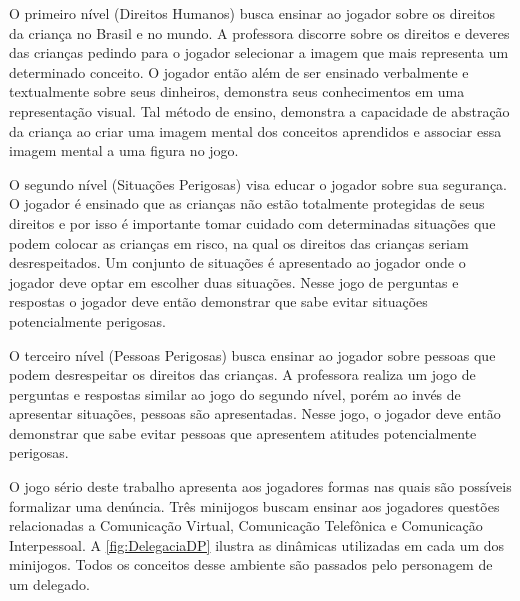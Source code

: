 O primeiro nível (Direitos Humanos) busca ensinar ao jogador sobre os direitos da criança no Brasil e no mundo. A professora discorre sobre os direitos e deveres das crianças pedindo para o jogador selecionar a imagem que mais representa um determinado conceito. O jogador então além de ser ensinado verbalmente e textualmente sobre seus dinheiros, demonstra seus conhecimentos em uma representação visual. Tal método de ensino, demonstra a capacidade de abstração da criança ao criar uma imagem mental dos conceitos aprendidos e associar essa imagem mental a uma figura no jogo. 

O segundo nível (Situações Perigosas) visa educar o jogador sobre sua segurança. O jogador é ensinado que as crianças não estão totalmente protegidas de seus direitos e por isso é importante tomar cuidado com determinadas situações que podem colocar as crianças em risco, na qual os direitos das crianças seriam desrespeitados. Um conjunto de situações é apresentado ao jogador onde o jogador deve optar em escolher duas situações. Nesse jogo de perguntas e respostas o jogador deve então demonstrar que sabe evitar situações potencialmente perigosas.

O terceiro nível (Pessoas Perigosas) busca ensinar ao jogador sobre pessoas que podem desrespeitar os direitos das crianças. A professora realiza um jogo de perguntas e respostas similar ao jogo do segundo nível, porém ao invés de apresentar situações, pessoas são apresentadas. Nesse jogo, o jogador deve então demonstrar que sabe evitar pessoas que apresentem atitudes potencialmente perigosas.


O jogo sério deste trabalho apresenta aos jogadores formas nas quais são possíveis formalizar uma denúncia. Três minijogos buscam ensinar aos jogadores questões relacionadas a Comunicação Virtual, Comunicação Telefônica e Comunicação Interpessoal. A \autoref{fig:DelegaciaDP} ilustra as dinâmicas utilizadas em cada um dos minijogos. Todos os conceitos desse ambiente são passados pelo personagem de um delegado. 

